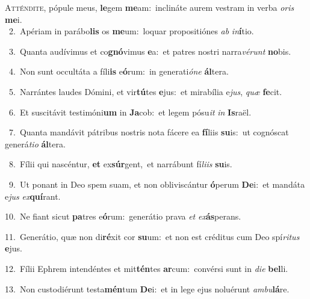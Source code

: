 \lettrine{\initial\textcolor{\initialcolor}{A}}{tténdite,} pópule meus, \textbf{le}\-gem \textbf{me}\-am:~\star inclináte aurem vestram in verba \textit{o}\-\textit{ris} \textbf{me}\-i.\\
{\numbfont\textcolor{\numbcolor}{~2.}}~Apériam in parábo\textbf{lis} os \textbf{me}\-um:~\star loquar propositiónes \textit{ab} \textit{in}\-\textbf{í}tio.\par
{\numbfont\textcolor{\numbcolor}{~3.}}~Quanta audívimus et co\-\textbf{gnó}\-vimus \textbf{e}\-a:~\star et patres nostri narra\-\textit{vé}\-\textit{runt} \textbf{no}\-bis.\par
{\numbfont\textcolor{\numbcolor}{~4.}}~Non sunt occultáta a fíli\textbf{is} e\-\textbf{ó}\-rum:~\star in generati\-\textit{ó}\-\textit{ne} \textbf{ál}\-tera.\par
{\numbfont\textcolor{\numbcolor}{~5.}}~Narrántes laudes Dómini, et vir\-\textbf{tú}\-tes \textbf{e}\-jus:~\star et mirabília e\-\textit{jus}\-, \textit{quæ} \textbf{fe}\-cit.\par
{\numbfont\textcolor{\numbcolor}{~6.}}~Et suscitávit testimóni\textbf{um} in \textbf{Ja}\-cob:~\star et legem pósu\textit{it} \textit{in} \textbf{Is}\-raël.\par
{\numbfont\textcolor{\numbcolor}{~7.}}~Quanta mandávit pátribus nostris nota fácere ea \textbf{fí}\-liis \textbf{su}\-is:~\star ut cognóscat generá\-\textit{ti}\-\textit{o} \textbf{ál}\-tera.\par
{\numbfont\textcolor{\numbcolor}{~8.}}~Fílii qui nascéntur, \textbf{et} ex\-\textbf{súr}\-gent,~\star et narrábunt fí\-\textit{li}\-\textit{is} \textbf{su}\-is.\par
{\numbfont\textcolor{\numbcolor}{~9.}}~Ut ponant in Deo spem suam, et non obliviscántur \textbf{ó}\-perum \textbf{De}\-i:~\star et mandáta e\textit{jus} \textit{ex}\-\textbf{quí}rant.\par
{\numbfont\textcolor{\numbcolor}{10.}}~Ne fiant sicut \textbf{pa}\-tres e\-\textbf{ó}\-rum:~\star generátio prava \textit{et} \textit{ex}\-\textbf{ás}perans.\par
{\numbfont\textcolor{\numbcolor}{11.}}~Generátio, quæ non di\-\textbf{ré}\-xit cor \textbf{su}\-um:~\star et non est créditus cum Deo spí\-\textit{ri}\-\textit{tus} \textbf{e}\-jus.\par
{\numbfont\textcolor{\numbcolor}{12.}}~Fílii Ephrem intendéntes et mit\-\textbf{tén}\-tes \textbf{ar}\-cum:~\star convérsi sunt in \textit{di}\-\textit{e} \textbf{bel}\-li.\par
{\numbfont\textcolor{\numbcolor}{13.}}~Non custodiérunt testa\-\textbf{mén}\-tum \textbf{De}\-i:~\star et in lege ejus noluérunt \textit{am}\-\textit{bu}\textbf{lá}re.\par
